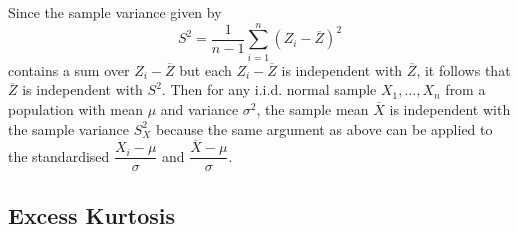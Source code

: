 \documentclass[11pt]{report} %
\begin{document}
Since the sample variance given by
\begin{equation}
S^{2} = \frac{1}{n - 1}\sum_{i = 1}^{n}\left(Z_{i} - \overline{Z}\right)^{2}
\end{equation}
contains a sum over $Z_{i} - \overline{Z}$ but each $Z_{i} - \overline{Z}$ is independent with $\overline{Z}$, it follows that $\overline{Z}$ is independent with $S^{2}$. Then for any i.i.d. normal sample $X_{1}, \dots, X_{n}$ from a population with mean $\mu$ and variance $\sigma^{2}$, the sample mean $\overline{X}$ is independent with the sample variance $S_{X}^{2}$ because the same argument as above can be applied to the standardised $\dfrac{X_{i} - \mu}{\sigma}$ and $\dfrac{\overline{X} - \mu}{\sigma}$.

\subsection{Excess Kurtosis}
\end{document}
